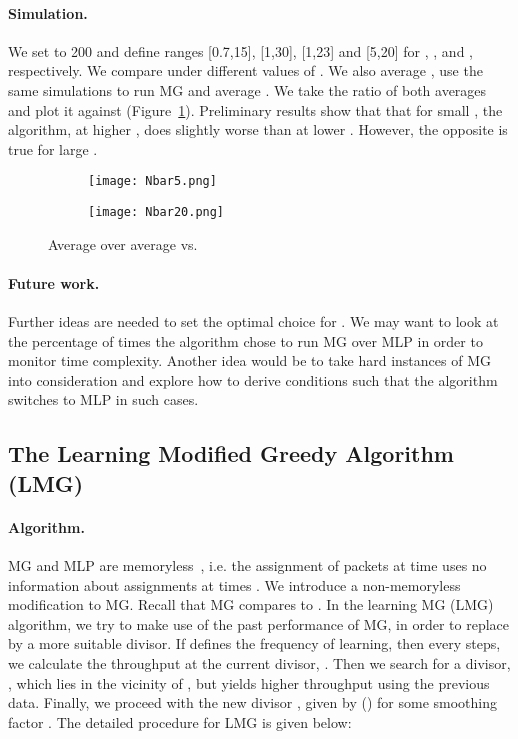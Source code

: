 \documentclass[oribibl]{llncs}
\begin{document}
\paragraph {Simulation.} We set  to 200 and define ranges [0.7,15], [1,30], [1,23] and [5,20] for , ,  and , respectively. We compare  under different values of . We also average , use the same simulations to run MG and average . We take the ratio of both averages and plot it against  (Figure~\ref{fig:MMvsMG}). Preliminary results show that that for small , the algorithm, at higher , does slightly worse than at lower . However, the opposite is true for large . 

\begin{figure}[h!]\centering
\begin{subfigure}{.46\textwidth}
  \centering
  \texttt{[image: Nbar5.png]}
  \caption{}
\end{subfigure}
\hfill
\begin{subfigure}{.46\textwidth}
  \centering
  \texttt{[image: Nbar20.png]}
  \caption{}
\end{subfigure}
\caption{Average  over average  vs. }
\label{fig:MMvsMG}
\end{figure}

\paragraph{Future work.}  Further ideas are needed
to set the optimal choice for . We may want to look at the
percentage of times the algorithm chose to run MG over MLP in order to
monitor time complexity. Another idea would be to take hard instances
of MG into consideration and explore how to derive conditions such
that the algorithm switches to MLP in such cases.

\subsection{The Learning Modified Greedy Algorithm (LMG)}
\paragraph{Algorithm.} MG and MLP are memoryless~\cite{jez12},
i.e. the assignment of packets at time  uses no information about
assignments at times .  
We introduce a non-memoryless modification to MG.
Recall that MG
compares  to . In the
learning MG (LMG) algorithm, we try to make use of the past
performance of MG, in order to replace  by a more suitable
divisor. If  defines the frequency of learning, then every  steps, we calculate the throughput at the current divisor, . Then we search for a divisor, , which lies in the vicinity of , but yields higher throughput using the previous data. Finally, we proceed with the new divisor , given by ()  for some smoothing factor . The detailed procedure for LMG is given below: 
\end{document}
